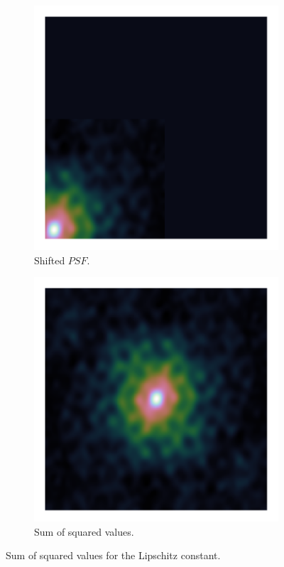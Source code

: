 \begin{figure}[h]
	\centering
	\begin{subfigure}[b]{0.3\linewidth}
		\includegraphics[width=\linewidth, clip, trim= 0.25in 0.25in 0.25in 0.25in]{./chapters/03.cd/simulated/psfZeroPadding.png}
		\caption{Shifted $PSF$.}
		\label{cd:efficient:lipschitz:padded}
	\end{subfigure}
	\begin{subfigure}[b]{0.3\linewidth}
		\includegraphics[width=\linewidth, clip, trim= 0.25in 0.25in 0.25in 0.25in]{./chapters/03.cd/simulated/psf.png}
		\caption{Sum of squared values.}
		\label{cd:efficient:lipschitz:rectangle}
	\end{subfigure}
	\caption{Sum of squared values for the Lipschitz constant.}
	\label{cd:efficient:lipschitz:figure}
\end{figure}

